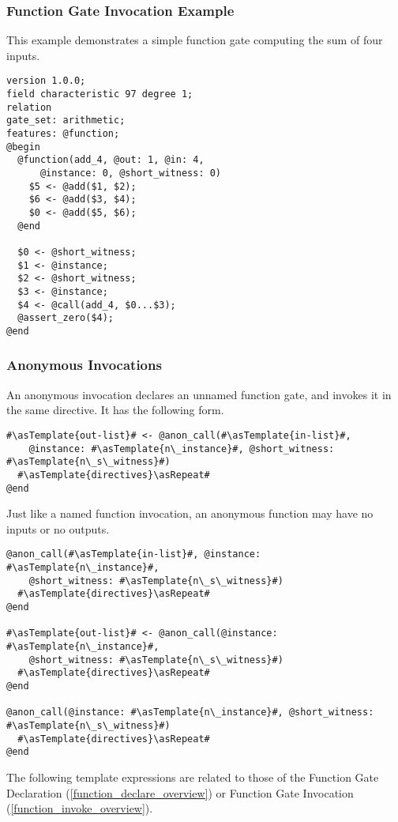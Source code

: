\subsubsection*{Function Gate Invocation Example}
This example demonstrates a simple function gate computing the sum of four inputs.

\begin{lstlisting}
version 1.0.0;
field characteristic 97 degree 1;
relation
gate_set: arithmetic;
features: @function;
@begin
  @function(add_4, @out: 1, @in: 4,
      @instance: 0, @short_witness: 0)
    $5 <- @add($1, $2);
    $6 <- @add($3, $4);
    $0 <- @add($5, $6);
  @end

  $0 <- @short_witness;
  $1 <- @instance;
  $2 <- @short_witness;
  $3 <- @instance;
  $4 <- @call(add_4, $0...$3);
  @assert_zero($4);
@end
\end{lstlisting}

\subsubsection*{Anonymous Invocations}
An anonymous invocation declares an unnamed function gate, and invokes it in the same directive.
It has the following form.\\

\begin{lstlisting}
#\asTemplate{out-list}# <- @anon_call(#\asTemplate{in-list}#,
    @instance: #\asTemplate{n\_instance}#, @short_witness: #\asTemplate{n\_s\_witness}#)
  #\asTemplate{directives}\asRepeat#
@end
\end{lstlisting}

Just like a named function invocation, an anonymous function may have no inputs or no outputs.

\begin{lstlisting}
@anon_call(#\asTemplate{in-list}#, @instance: #\asTemplate{n\_instance}#,
    @short_witness: #\asTemplate{n\_s\_witness}#)
  #\asTemplate{directives}\asRepeat#
@end

#\asTemplate{out-list}# <- @anon_call(@instance: #\asTemplate{n\_instance}#,
    @short_witness: #\asTemplate{n\_s\_witness}#)
  #\asTemplate{directives}\asRepeat#
@end

@anon_call(@instance: #\asTemplate{n\_instance}#, @short_witness: #\asTemplate{n\_s\_witness}#)
  #\asTemplate{directives}\asRepeat#
@end
\end{lstlisting}

The following template expressions are related to those of the Function Gate Declaration (\ref{function_declare_overview}) or Function Gate Invocation (\ref{function_invoke_overview}).


